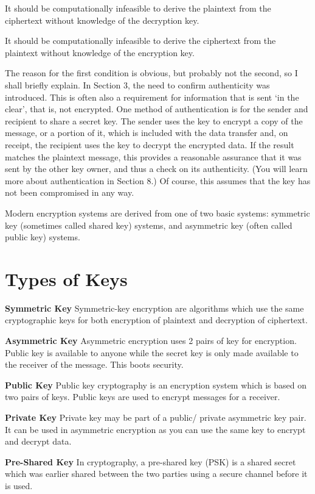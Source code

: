 \documentclass[BTech]{srmuthesis}
\begin{document}
  It should be computationally infeasible to derive the plaintext from the ciphertext without knowledge of the decryption key.

  It should be computationally infeasible to derive the ciphertext from the plaintext without knowledge of the encryption key.

  The reason for the first condition is obvious, but probably not the second, so I shall briefly explain. In Section 3, the need to confirm authenticity was introduced. This is often also a requirement for information that is sent ‘in the clear’, that is, not encrypted. One method of authentication is for the sender and recipient to share a secret key. The sender uses the key to encrypt a copy of the message, or a portion of it, which is included with the data transfer and, on receipt, the recipient uses the key to decrypt the encrypted data. If the result matches the plaintext message, this provides a reasonable assurance that it was sent by the other key owner, and thus a check on its authenticity. (You will learn more about authentication in Section 8.) Of course, this assumes that the key has not been compromised in any way.

  Modern encryption systems are derived from one of two basic systems: symmetric key (sometimes called shared key) systems, and asymmetric key (often called public key) systems.

  \section{Types of Keys}
  \textbf{Symmetric Key} Symmetric-key encryption are algorithms which use the same cryptographic keys for both encryption of plaintext and decryption of ciphertext.

  \textbf{Asymmetric Key} Asymmetric encryption uses 2 pairs of key for encryption. Public key is available to anyone while the secret key is only made available to the receiver of the message. This boots security.

  \textbf{Public Key} Public key cryptography is an encryption system which is based on two pairs of keys. Public keys are used to encrypt messages for a receiver.

  \textbf{Private Key} Private key may be part of a public/ private asymmetric key pair. It can be used in asymmetric encryption as you can use the same key to encrypt and decrypt data.

  \textbf{Pre-Shared Key} In cryptography, a pre-shared key (PSK) is a shared secret which was earlier shared between the two parties using a secure channel before it is used.
\end{document}
